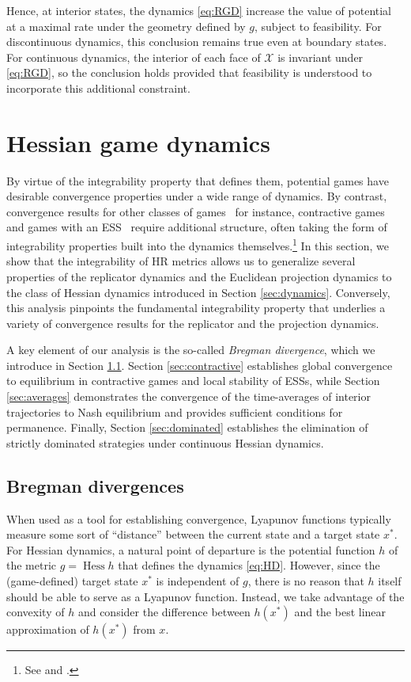 \documentclass[reqno]{amsart}
\theoremstyle{plain}
\theoremstyle{definition}
\theoremstyle{remark}
\numberwithin{equation}{section}
\numberwithin{theorem}{section}
\begin{document}
Hence, at interior states, the dynamics \eqref{eq:RGD} increase the value of potential at a maximal rate under the geometry defined by $g$, subject to feasibility.
For discontinuous dynamics, this conclusion remains true even at boundary states.
For continuous dynamics, the interior of each face of ${\mathcal{X}}$ is invariant under \eqref{eq:RGD}, so the conclusion holds provided that feasibility is understood to incorporate this additional constraint.

\section{Hessian game dynamics}
\label{sec:HD}

By virtue of the integrability property that defines them, potential games have desirable convergence properties under a wide range of dynamics.
By contrast, convergence results for other classes of games \textendash\ for instance, contractive games and games with an \ac{ESS} \textendash\ require additional structure, often taking the form of integrability properties built into the dynamics themselves.\footnote{See \cite{HS07} and \cite{San10c}.}
In this section, we show that the integrability of \acl{HR} metrics allows us to generalize several properties of the replicator dynamics and the Euclidean projection dynamics to the class of Hessian dynamics introduced in Section \ref{sec:dynamics}.
Conversely, this analysis pinpoints the fundamental integrability property that underlies a variety of convergence results for the replicator and the projection dynamics.

A key element of our analysis is the so-called \emph{Bregman divergence}, which we introduce in Section \ref{sec:Bregman}.
Section \ref{sec:contractive} establishes global convergence to equilibrium in contractive games and local stability of \acp{ESS}, while Section \ref{sec:averages} demonstrates the convergence of the time-averages of interior trajectories to Nash equilibrium and provides sufficient conditions for permanence.
Finally, Section \ref{sec:dominated} establishes the elimination of strictly dominated strategies under continuous Hessian dynamics.

\subsection{Bregman divergences}
\label{sec:Bregman}

When used as a tool for establishing convergence, Lyapunov functions typically measure some sort of ``distance'' between the current state and a target state ${x^{\ast}}$.
For Hessian dynamics, a natural point of departure is the potential function $h$ of the metric $g=\operatorname{Hess} h$ that defines the dynamics \eqref{eq:HD}.
However, since the (game-defined) target state ${x^{\ast}}$ is independent of $g$, there is no reason that $h$ itself should be able to serve as a Lyapunov function.
Instead, we take advantage of the convexity of $h$ and consider the difference between $h({x^{\ast}})$ and the best linear approximation of $h({x^{\ast}})$ from ${x}$.
\end{document}
